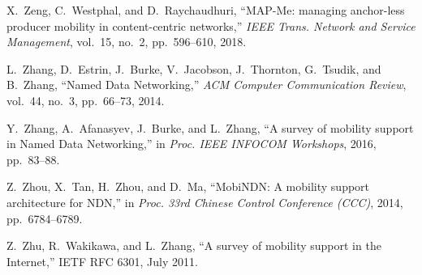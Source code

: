 \begin{thebibliography}{99}
X.~Zeng, C.~Westphal, and D.~Raychaudhuri,
``MAP-Me: managing anchor-less producer mobility in content-centric networks,''
\textit{IEEE Trans. Network and Service Management},
vol.~15, no.~2, pp.~596--610, 2018.

L.~Zhang, D.~Estrin, J.~Burke, V.~Jacobson, J.~Thornton, G.~Tsudik, and B.~Zhang,
``Named Data Networking,''
\textit{ACM Computer Communication Review},
vol.~44, no.~3, pp.~66--73, 2014.

Y.~Zhang, A.~Afanasyev, J.~Burke, and L.~Zhang,
``A survey of mobility support in Named Data Networking,''
in \textit{Proc. IEEE INFOCOM Workshops},
2016, pp.~83--88.

Z.~Zhou, X.~Tan, H.~Zhou, and D.~Ma,
``MobiNDN: A mobility support architecture for NDN,''
in \textit{Proc. 33rd Chinese Control Conference (CCC)},
2014, pp.~6784--6789.

Z.~Zhu, R.~Wakikawa, and L.~Zhang,
``A survey of mobility support in the Internet,''
IETF RFC 6301, July 2011.

\end{thebibliography}
